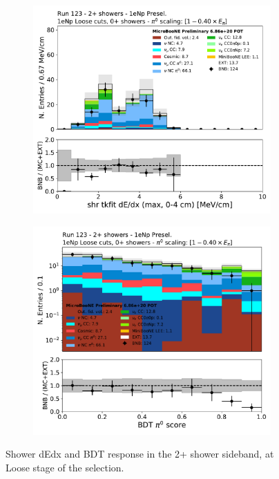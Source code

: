 \begin{figure}[H]
    \begin{center}
    \begin{subfigure}{0.4\textwidth}
    \includegraphics[width=1.00\textwidth]{Sidebands/Figures/1eNp/TwoShower/TwoPShr_NP_NPLAllShr_pi0e040/shr_tkfit_dedx_max.pdf}
    \end{subfigure}
    \begin{subfigure}{0.4\textwidth}
    \includegraphics[width=1.00\textwidth]{Sidebands/Figures/1eNp/TwoShower/TwoPShr_NP_NPLAllShr_pi0e040/pi0_score_log.pdf}
    \end{subfigure}
    \caption{\label{fig:sb:1eNp:twopshr:loose:dedxbdt} Shower dEdx and BDT response in the 2+ shower sideband, at Loose stage of the \npsel selection.}
    \end{center}
\end{figure}

